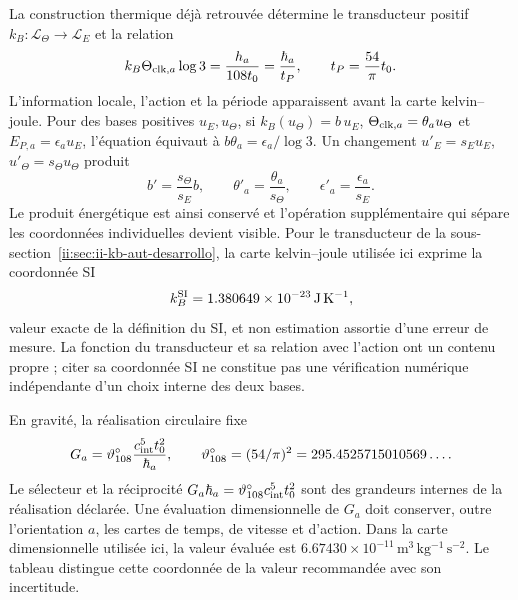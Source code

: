 La construction thermique déjà retrouvée détermine le transducteur positif
\(k_B:\mathcal L_\Theta\to\mathcal L_E\) et la relation
\begin{equation}
 k_B\Theta_{{\rm clk},a}\log3
 =\frac{h_a}{108t_0}=\frac{\hbar_a}{t_P},
 \qquad t_P=\frac{54}{\pi}t_0.
 \label{ii:eq:ii-kb-comparacion}
\end{equation}
L’information locale, l’action et la période apparaissent avant la carte
kelvin--joule. Pour des bases positives \(u_E,u_\Theta\), si
\(k_B(u_\Theta)=b\,u_E\),
\(\Theta_{{\rm clk},a}=\theta_a u_\Theta\) et
\(E_{P,a}=\epsilon_a u_E\), l’équation équivaut à
\(b\theta_a=\epsilon_a/\log3\). Un changement
\(u'_E=s_Eu_E\), \(u'_\Theta=s_\Theta u_\Theta\) produit
\[
 b'=\frac{s_\Theta}{s_E}b,\qquad
 \theta'_a=\frac{\theta_a}{s_\Theta},\qquad
 \epsilon'_a=\frac{\epsilon_a}{s_E}.
\]
Le produit énergétique est ainsi conservé et l’opération
supplémentaire qui sépare les coordonnées individuelles devient visible. Pour le transducteur
de la sous-section~\ref{ii:sec:ii-kb-aut-desarrollo}, la carte kelvin--joule
utilisée ici exprime la coordonnée SI
\[
 k_B^{\rm SI}=1.380649\times10^{-23}\,\mathrm{J\,K^{-1}},
\]
valeur exacte de la définition du SI, et non estimation assortie d’une erreur de mesure.
La fonction du transducteur et sa relation avec l’action ont un contenu
propre ; citer sa coordonnée SI ne constitue pas une vérification numérique
indépendante d’un choix interne des deux bases.

En gravité, la réalisation circulaire fixe
\begin{equation}
 G_a=\vartheta_{108}^{\circ}\frac{c_{\rm int}^{5}t_0^2}{\hbar_a},
 \qquad
 \vartheta_{108}^{\circ}=(54/\pi)^2
 =295.4525715010569\ldots.
 \label{ii:eq:ii-g-comparacion}
\end{equation}
Le sélecteur et la réciprocité \(G_a\hbar_a=
\vartheta_{108}^{\circ}c_{\rm int}^{5}t_0^2\) sont des grandeurs internes de
la réalisation déclarée. Une évaluation dimensionnelle de \(G_a\) doit
conserver, outre l’orientation \(a\), les cartes de temps,
de vitesse et d’action. Dans la carte dimensionnelle utilisée ici, la valeur évaluée est
\(6.67430\times10^{-11}\,\mathrm{m^3\,kg^{-1}\,s^{-2}}\).
Le tableau distingue cette coordonnée de la
valeur recommandée avec son incertitude.

